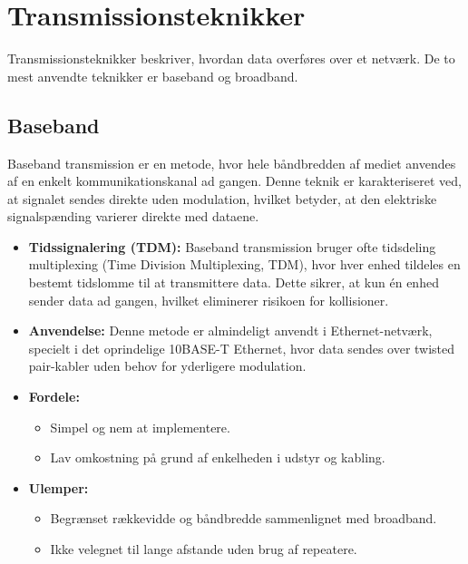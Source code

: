 \section{Transmissionsteknikker}
Transmissionsteknikker beskriver, hvordan data overføres over et netværk. De to mest anvendte teknikker er baseband og broadband.

\subsection{Baseband}
Baseband transmission er en metode, hvor hele båndbredden af mediet anvendes af en enkelt kommunikationskanal ad gangen. Denne teknik er karakteriseret ved, at signalet sendes direkte uden modulation, hvilket betyder, at den elektriske signalspænding varierer direkte med dataene.
\begin{itemize}
	\item \textbf{Tidssignalering (TDM):} Baseband transmission bruger ofte tidsdeling multiplexing (Time Division Multiplexing, TDM), hvor hver enhed tildeles en bestemt tidslomme til at transmittere data. Dette sikrer, at kun én enhed sender data ad gangen, hvilket eliminerer risikoen for kollisioner.
	\item \textbf{Anvendelse:} Denne metode er almindeligt anvendt i Ethernet-netværk, specielt i det oprindelige 10BASE-T Ethernet, hvor data sendes over twisted pair-kabler uden behov for yderligere modulation.
	\item \textbf{Fordele:}
	\begin{itemize}
		\item Simpel og nem at implementere.
		\item Lav omkostning på grund af enkelheden i udstyr og kabling.
	\end{itemize}
	\item \textbf{Ulemper:}
	\begin{itemize}
		\item Begrænset rækkevidde og båndbredde sammenlignet med broadband.
		\item Ikke velegnet til lange afstande uden brug af repeatere.
	\end{itemize}
\end{itemize}

